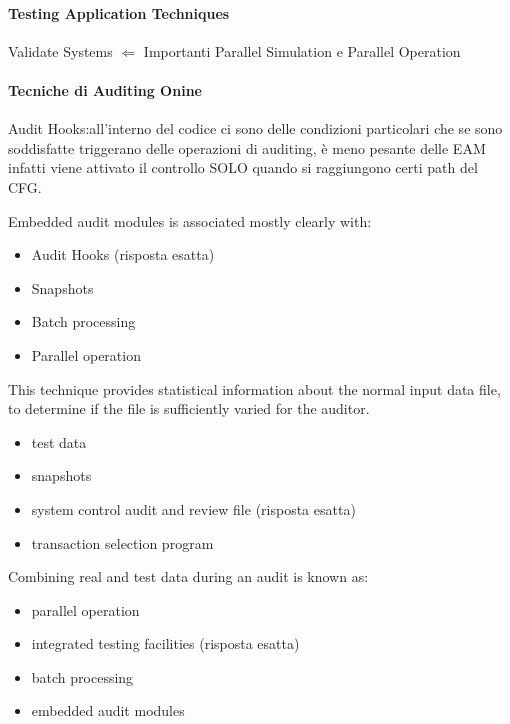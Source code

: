 \paragraph{Testing Application Techniques}
Validate Systems $\Leftarrow$ Importanti Parallel Simulation e Parallel
Operation



\paragraph{Tecniche di Auditing Onine}
Audit Hooks:all'interno del codice ci sono delle condizioni particolari che se
sono soddisfatte triggerano delle operazioni di auditing, è meno pesante delle
EAM infatti viene attivato il controllo SOLO quando si raggiungono certi path
del CFG.



Embedded audit modules is associated mostly clearly with:
\begin{itemize}
\item Audit Hooks (risposta esatta)
\item Snapshots
\item Batch processing
\item Parallel operation
\end{itemize}

This technique provides statistical information about the normal input data
file, to determine if the file is sufficiently varied for the auditor.

\begin{itemize}
\item test data
\item snapshots
\item system control audit and review file (risposta esatta)
\item transaction selection program
\end{itemize}


Combining real and test data during an audit is known as:
\begin{itemize}
\item parallel operation
\item integrated testing facilities (risposta esatta)
\item batch processing
\item embedded audit modules
\end{itemize}


